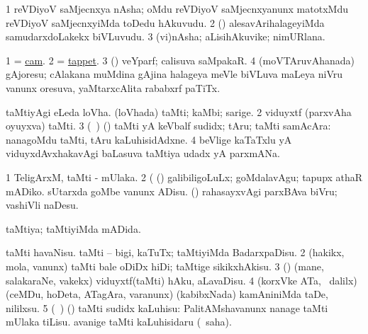 \bentry
{}
\gl{\nA}
\bmng
\bnum
\num{1} reVDiyoV saMjecnxya nAsha; oMdu reVDiyoV saMjecnxyanunx matotxMdu reVDiyoV saMjecnxyiMda toDedu hAkuvudu. 
\num{2} (\ashi) alesavArihalageyiMda  samudarxdoLakekx biVLuvudu. 
\num{3} (vi)nAsha; aLisihAkuvike; nimURlana. 
\enum
\emng
\eentry

\bentry
{}
\gl{\nA}
\bmng
\bnum
\num{1} = \hyperref{kandict_c.pdf}{C}{cam}{cam}. 
\num{2} = \hyperref{kandict_t.pdf}{T}{tappet}{tappet}. 
\num{3} (\viduyx) veYparf; calisuva saMpakaR. 
\num{4} (moVTAruvAhanada) gAjoresu; cAlakana muMdina gAjina halageya meVle biVLuva maLeya niVru \mo vanunx oresuva, yaMtarxcAlita rababxrf paTiTx. 
\enum
\emng
\eentry

\bentry
{}
\gl{\saMkiSx}
\bmng
{} 
\emng
\eentry

\bentry
{} 
\gl{\nA}
\expl{}
\bmng
\bnum
{} 
\banum
{} taMtiyAgi eLeda loVha. 
 (loVhada) taMti; kaMbi; sarige. 
\eanum
\numie
\num{2} viduyxtf (parxvAha oyuyxva) taMti. 
\num{3} (\kanmu\ \ame) (\AmA) taMti yA keVbalf sudidx; tAru; taMti samAcAra:  nanagoMdu taMti, tAru kaLuhisidAdxne. 
\num{4} beVlige kaTaTxlu yA viduyxdAvxhakavAgi baLasuva taMtiya udadx yA parxmANa. 
\enum
\emng

\noindent
\gl{\pagu}
\bmng
\bnum
\num{1}  TeligArxM, taMti - mUlaka. 
\num{2}  (  (\rUpa) galibiligoLuLx; goMdalavAgu; tapupx athaR mADiko. 
  
\banum
{} sUtarxda goMbe \mo vanunx ADisu. 
 (\rUpa) rahasayxvAgi parxBAva biVru; vashiVli naDesu. 
\eanum
\numie
\enum
\emng
\eentry

\bentry
{} 
\gl{\gu}
\bmng
taMtiya; taMtiyiMda mADida. 
\emng
\eentry

\bentry
{} 
\gl{\sakirx}
\bmng
\bnum
{} 
\banum
{} taMti havaNisu. 
 taMti -- bigi, kaTuTx; taMtiyiMda BadarxpaDisu. 
\eanum
\numie
\num{2} (hakikx, mola, \mo vanunx) taMti bale oDiDx hiDi; taMtige sikikxhAkisu. 
\num{3} (\viduyx) (mane, salakaraNe, \mo vakekx) viduyxtf(taMti) hAku, aLavaDisu. 
\num{4} (korxVke ATa, \sA\, \BUkaq dalilx) (ceMDu, hoDeta, ATagAra, \mo varanunx) (kabibxNada) kamAniniMda taDe, nililxsu. 
\num{5} (\kanmu\ \ame) (\AmA) taMti sudidx kaLuhisu:  PalitAMshavanunx nanage taMti mUlaka tiLisu.  avanige taMti kaLuhisidaru (\akirx\ saha). 
\enum
\emng
\eentry

